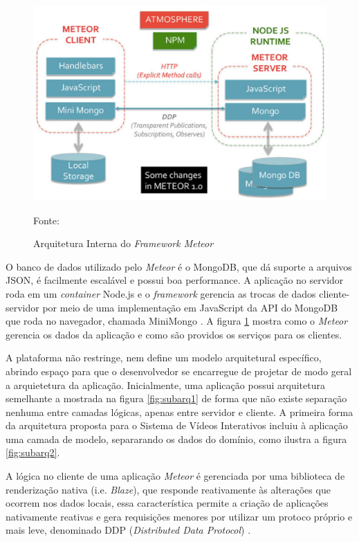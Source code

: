 \begin{figure}[h!]
	\centering
	\includegraphics[width=.8\linewidth]{figuras/meteorarq.eps}	
  	\caption{Arquitetura Interna do \textit{Framework Meteor}}
	\small{Fonte: \cite{mongodb2015}}
  	\label{fig:meteorarq}
\end{figure}

O banco de dados utilizado pelo \textit{Meteor} é o MongoDB, que dá suporte a arquivos JSON, é facilmente escalável e possui boa performance. A aplicação no servidor roda em um \textit{container} Node.js e o \textit{framework} gerencia as trocas de dados cliente-servidor por meio de uma implementação em JavaScript da API do MongoDB que roda no navegador, chamada MiniMongo \cite{mongodb2015}. A figura \ref{fig:meteorarq} mostra como o \textit{Meteor}  gerencia os dados da aplicação e como são providos os serviços para os clientes. 

A plataforma não restringe, nem define um modelo arquitetural específico, abrindo espaço para que o desenvolvedor se encarregue de projetar de modo geral a arquietetura da aplicação. Inicialmente, uma aplicação possui arquitetura semelhante a mostrada na figura \ref{fig:subarq1} de forma que não existe separação nenhuma entre camadas lógicas, apenas entre servidor e cliente. A primeira forma da arquitetura proposta para o Sistema de Vídeos Interativos incluiu à aplicação uma camada de modelo, separarando os dados do domínio, como ilustra a figura \ref{fig:subarq2}.

A lógica no cliente de uma aplicação \textit{Meteor} é gerenciada por uma biblioteca de renderização nativa (i.e. \textit{Blaze}), que responde reativamente às alterações que ocorrem nos dados locais, essa característica permite a criação de aplicações nativamente reativas e gera requisições menores por utilizar um protoco próprio e mais leve, denominado DDP (\textit{Distributed Data Protocol}) \cite{blaze2015}. 

